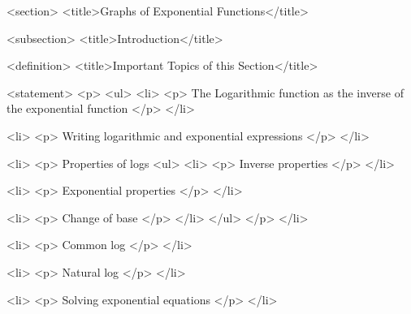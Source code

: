 <section>
    <title>Graphs of Exponential Functions</title>

    <subsection>
        <title>Introduction</title>

        <definition>
            <title>Important Topics of this Section</title>

            <statement>
                <p>
                    <ul>
                        <li>
                            <p>
                                The Logarithmic function as the inverse of the exponential function
                            </p>
                        </li>

                        <li>
                            <p>
                                Writing logarithmic and exponential expressions
                            </p>
                        </li>

                        <li>
                            <p>
                                Properties of logs
                                <ul>
                                    <li>
                                        <p>
                                            Inverse properties
                                        </p>
                                    </li>

                                    <li>
                                        <p>
                                            Exponential properties
                                        </p>
                                    </li>

                                    <li>
                                        <p>
                                            Change of base
                                        </p>
                                    </li>
                                </ul>
                            </p>
                        </li>

                        <li>
                            <p>
                                Common log
                            </p>
                        </li>

                        <li>
                            <p>
                                Natural log
                            </p>
                        </li>

                        <li>
                            <p>
                                Solving exponential equations
                            </p>
                        </li>

